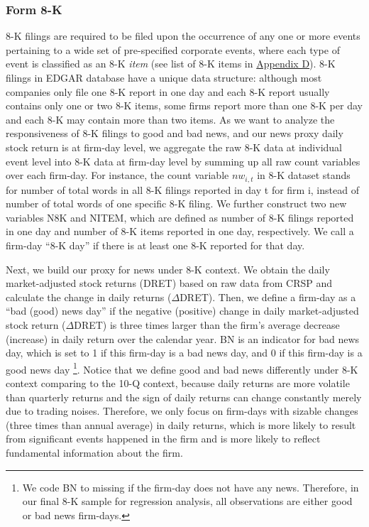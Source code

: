 \documentclass[a4paper]{article}
\begin{document}
\begin{spacing}{2}
\subsubsection{Form 8-K}
8-K filings are required to be filed upon the occurrence of any one or more events pertaining to a wide set of pre-specified corporate events, where each type of event is classified as an 8-K \textit{item} (see list of 8-K items in \hyperref[appd]{Appendix D}). 
8-K filings in EDGAR database have a unique data structure: although most companies only file one 8-K report in one day and each 8-K report usually contains only one or two 8-K items, some firms report more than one 8-K per day and each 8-K may contain more than two items. As we want to analyze the responsiveness of 8-K filings to good and bad news, and our news proxy daily stock return is at firm-day level, we aggregate the raw 8-K data at individual event level into 8-K data at firm-day level by summing up all raw count variables over each firm-day. For instance, the count variable $nw_{i,t}$ in 8-K dataset stands for number of total words in all 8-K filings reported in day t for firm i, instead of number of total words of one specific 8-K filing. We further construct two new variables N8K and NITEM, which are defined as number of 8-K filings reported in one day and number of 8-K items reported in one day, respectively. We call a firm-day “8-K day” if there is at least one 8-K reported for that day.

Next, we build our proxy for news under 8-K context. We obtain the daily market-adjusted stock returns (DRET) based on raw data from CRSP and calculate the change in daily returns ($\Delta$DRET). Then, we define a firm-day as a “bad (good) news day” if the negative (positive) change in daily market-adjusted stock return ($\Delta$DRET) is three times larger than the firm's average decrease (increase) in daily return over the calendar year. BN is an indicator for bad news day, which is set to 1 if this firm-day is a bad news day, and 0 if this firm-day is a good news day \footnote{We code BN to missing if the firm-day does not have any news. Therefore, in our final 8-K sample for regression analysis, all observations are either good or bad news firm-days.}. Notice that we define good and bad news differently under 8-K context comparing to the 10-Q context, because daily returns are more volatile than quarterly returns and the sign of daily returns can change constantly merely due to trading noises. Therefore, we only focus on firm-days with sizable changes (three times than annual average) in daily returns, which is more likely to result from significant events happened in the firm and is more likely to reflect fundamental information about the firm.


\end{spacing}
\end{document}
